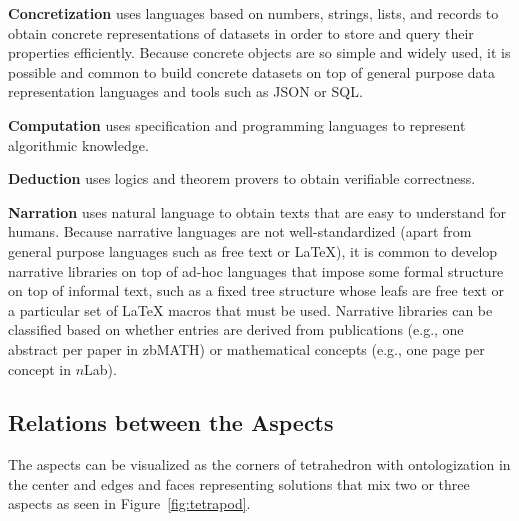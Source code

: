 \textbf{Concretization} uses languages based on numbers, strings, lists, and records to obtain concrete representations of datasets in order to store and query their properties efficiently.
Because concrete objects are so simple and widely used, it is possible and common to build concrete datasets on top of general purpose data representation languages and tools such as JSON or SQL.

\textbf{Computation} uses specification and programming languages to represent algorithmic knowledge.

\textbf{Deduction} uses logics and theorem provers  to obtain verifiable correctness.

\textbf{Narration} uses natural language to obtain texts that are easy to understand for humans.
Because narrative languages are not well-standardized (apart from general purpose languages such as free text or \LaTeX), it is common to develop narrative libraries on top of ad-hoc languages that impose some formal structure on top of informal text, such as a fixed tree structure whose leafs are free text or a particular set of {\LaTeX} macros that must be used.
Narrative libraries can be classified based on whether entries are derived from publications (e.g., one abstract per paper in zbMATH) or mathematical concepts (e.g., one page per concept in $n$Lab).



\subsection{Relations between the Aspects}

The aspects can be visualized as the corners of tetrahedron with ontologization in the center and edges and faces representing solutions that mix two or three aspects as seen in Figure~\ref{fig:tetrapod}.

